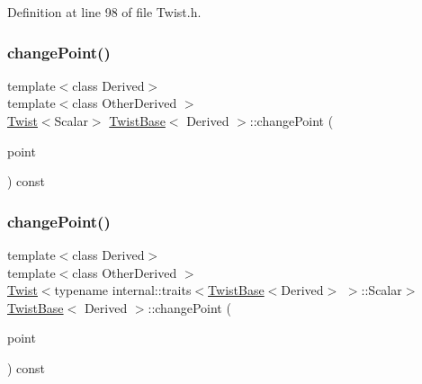 Definition at line 98 of file Twist.\+h.

\hypertarget{class_twist_base_a44ecd77777c54f0f632d6a89951c5884}{}\label{class_twist_base_a44ecd77777c54f0f632d6a89951c5884} 
\subsubsection{\texorpdfstring{change\+Point()}{changePoint()}\hspace{0.1cm}{\footnotesize\ttfamily [1/2]}}
{\footnotesize\ttfamily template$<$class Derived$>$ \\
template$<$class Other\+Derived $>$ \\
\hyperlink{class_twist}{Twist}$<$Scalar$>$ \hyperlink{class_twist_base}{Twist\+Base}$<$ Derived $>$\+::change\+Point (\begin{DoxyParamCaption}\item[{const Matrix\+Base$<$ Other\+Derived $>$ \&}]{point }\end{DoxyParamCaption}) const\hspace{0.3cm}{\ttfamily [inline]}}

\hypertarget{class_twist_base_a9cc4e024b42a1164268d8066b006289c}{}\label{class_twist_base_a9cc4e024b42a1164268d8066b006289c} 
\subsubsection{\texorpdfstring{change\+Point()}{changePoint()}\hspace{0.1cm}{\footnotesize\ttfamily [2/2]}}
{\footnotesize\ttfamily template$<$class Derived$>$ \\
template$<$class Other\+Derived $>$ \\
\hyperlink{class_twist}{Twist}$<$typename internal\+::traits$<$\hyperlink{class_twist_base}{Twist\+Base}$<$Derived$>$ $>$\+::Scalar$>$ \hyperlink{class_twist_base}{Twist\+Base}$<$ Derived $>$\+::change\+Point (\begin{DoxyParamCaption}\item[{const Matrix\+Base$<$ Other\+Derived $>$ \&}]{point }\end{DoxyParamCaption}) const\hspace{0.3cm}{\ttfamily [inline]}}



